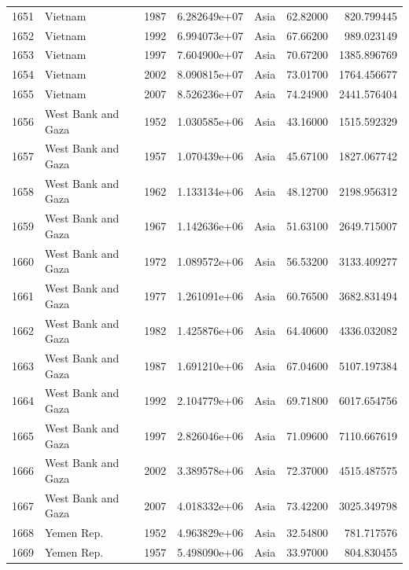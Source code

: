 \documentclass[
  letterpaper,
  DIV=11,
  numbers=noendperiod]{scrreprt}
\begin{document}
\begin{tabular}{llrrlrr}
1651 &                   Vietnam &  1987 &  6.282649e+07 &      Asia &  62.82000 &     820.799445 \\
1652 &                   Vietnam &  1992 &  6.994073e+07 &      Asia &  67.66200 &     989.023149 \\
1653 &                   Vietnam &  1997 &  7.604900e+07 &      Asia &  70.67200 &    1385.896769 \\
1654 &                   Vietnam &  2002 &  8.090815e+07 &      Asia &  73.01700 &    1764.456677 \\
1655 &                   Vietnam &  2007 &  8.526236e+07 &      Asia &  74.24900 &    2441.576404 \\
1656 &        West Bank and Gaza &  1952 &  1.030585e+06 &      Asia &  43.16000 &    1515.592329 \\
1657 &        West Bank and Gaza &  1957 &  1.070439e+06 &      Asia &  45.67100 &    1827.067742 \\
1658 &        West Bank and Gaza &  1962 &  1.133134e+06 &      Asia &  48.12700 &    2198.956312 \\
1659 &        West Bank and Gaza &  1967 &  1.142636e+06 &      Asia &  51.63100 &    2649.715007 \\
1660 &        West Bank and Gaza &  1972 &  1.089572e+06 &      Asia &  56.53200 &    3133.409277 \\
1661 &        West Bank and Gaza &  1977 &  1.261091e+06 &      Asia &  60.76500 &    3682.831494 \\
1662 &        West Bank and Gaza &  1982 &  1.425876e+06 &      Asia &  64.40600 &    4336.032082 \\
1663 &        West Bank and Gaza &  1987 &  1.691210e+06 &      Asia &  67.04600 &    5107.197384 \\
1664 &        West Bank and Gaza &  1992 &  2.104779e+06 &      Asia &  69.71800 &    6017.654756 \\
1665 &        West Bank and Gaza &  1997 &  2.826046e+06 &      Asia &  71.09600 &    7110.667619 \\
1666 &        West Bank and Gaza &  2002 &  3.389578e+06 &      Asia &  72.37000 &    4515.487575 \\
1667 &        West Bank and Gaza &  2007 &  4.018332e+06 &      Asia &  73.42200 &    3025.349798 \\
1668 &                Yemen Rep. &  1952 &  4.963829e+06 &      Asia &  32.54800 &     781.717576 \\
1669 &                Yemen Rep. &  1957 &  5.498090e+06 &      Asia &  33.97000 &     804.830455 \\

\end{tabular}
\end{document}
